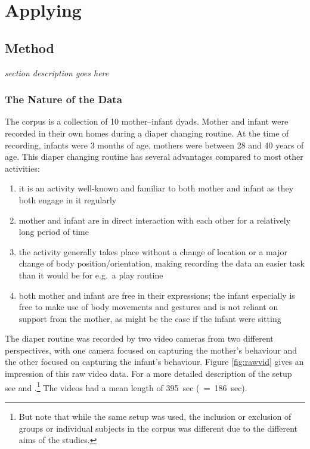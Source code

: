 
\chapter{Applying \fpmupper}
\label{ch:fpm}

\section{Method}
\label{sec:fpmmet}
\textit{section description goes here}

\subsection{The Nature of the Data}
\label{ssec:fpmmetnat}
The corpus is a collection of 10 mother--infant dyads.
Mother and infant were recorded in their own homes during a diaper changing routine.
At the time of recording, infants were 3 months of age, mothers were between 28 and 40 years of age.
This diaper changing routine has several advantages compared to most other activities:
\begin{enumerate}[label={\alph*)}]
	\item it is an activity well-known and familiar to both mother and infant as they both engage in it regularly
	\item mother and infant are in direct interaction with each other for a relatively long period of time
	\item the activity generally takes place without a change of location or a major change of body position/orientation, making recording the data an easier task than it would be for e.g.~a play routine
	\item both mother and infant are free in their expressions; the infant especially is free to make use of body movements and gestures and is not reliant on support from the mother, as might be the case if the infant were sitting
\end{enumerate}
The diaper routine was recorded by two video cameras from two different perspectives, with one camera focused on capturing the mother's behaviour and the other focused on capturing the infant's behaviour.
Figure \ref{fig:rawvid} gives an impression of this raw video data.
For a more detailed description of the setup see \citet[]{nomikou_verbs_2017} and \citet[]{nomikou_language_2011}.\footnote{But note that while the same setup was used, the inclusion or exclusion of groups or individual subjects in the corpus was different due to the different aims of the studies.}
The videos had a mean length of 395~sec (\sd~=~186~sec).

